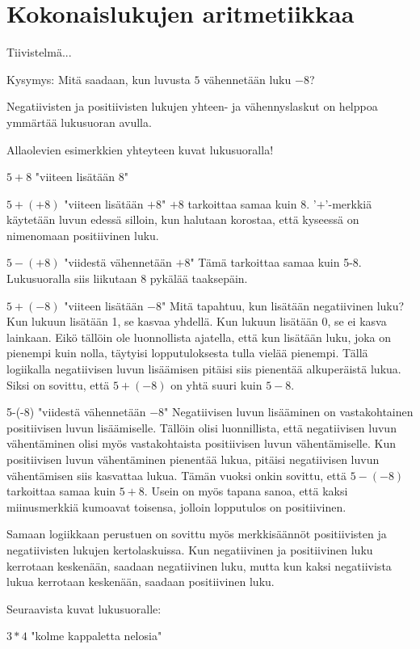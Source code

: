 \chapter{Kokonaislukujen aritmetiikkaa}

Tiivistelmä...

Kysymys: Mitä saadaan, kun luvusta $5$ vähennetään luku $-8$?

Negatiivisten ja positiivisten lukujen yhteen- ja vähennyslaskut on helppoa ymmärtää lukusuoran avulla.

Allaolevien esimerkkien yhteyteen kuvat lukusuoralla!

$5+8$ "viiteen lisätään $8$"

$5+(+8)$ "viiteen lisätään $+8$" $+8$ tarkoittaa samaa kuin $8$. '$+$'-merkkiä käytetään luvun edessä silloin, kun halutaan korostaa, että kyseessä on nimenomaan positiivinen luku.

$5-(+8)$ "viidestä vähennetään $+8$" Tämä tarkoittaa samaa kuin 5-8. Lukusuoralla siis liikutaan 8 pykälää taaksepäin.

$5+(-8)$ "viiteen lisätään $-8$" Mitä tapahtuu, kun lisätään negatiivinen luku? Kun lukuun lisätään 1, se kasvaa yhdellä. Kun lukuun lisätään 0, se ei kasva lainkaan. Eikö tällöin ole luonnollista ajatella, että kun lisätään luku, joka on pienempi kuin nolla, täytyisi lopputuloksesta tulla vielää pienempi. Tällä logiikalla negatiivisen luvun lisäämisen pitäisi siis pienentää alkuperäistä lukua. Siksi on sovittu, että $5+(-8)$ on yhtä suuri kuin $5-8$.

5-(-8) "viidestä vähennetään $-8$" Negatiivisen luvun lisääminen on vastakohtainen positiivisen luvun lisäämiselle. Tällöin olisi luonnillista, että negatiivisen luvun vähentäminen olisi myös vastakohtaista positiivisen luvun vähentämiselle. Kun positiivisen luvun vähentäminen pienentää lukua, pitäisi negatiivisen luvun vähentämisen siis kasvattaa lukua. Tämän vuoksi onkin sovittu, että $5-(-8)$ tarkoittaa samaa kuin $5+8$. Usein on myös tapana sanoa, että kaksi miinusmerkkiä kumoavat toisensa, jolloin lopputulos on positiivinen.

Samaan logiikkaan perustuen on sovittu myös merkkisäännöt positiivisten ja negatiivisten lukujen kertolaskuissa. Kun negatiivinen ja positiivinen luku kerrotaan keskenään, saadaan negatiivinen luku, mutta kun kaksi negatiivista lukua kerrotaan keskenään, saadaan positiivinen luku.

Seuraavista kuvat lukusuoralle:

$3*4$ "kolme kappaletta nelosia"

